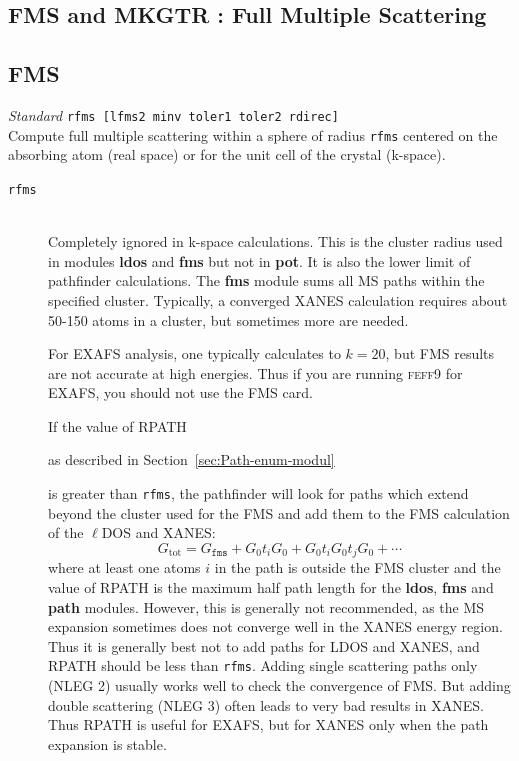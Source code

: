 \documentclass[11pt,oneside]{report} %
\renewcommand{\htmlref}[2]{\hyperlink{#2}{#1}}
\newcommand{\program}[1]{\textsc{#1}}
\newcommand{\feff}{\program{feff}}
\newcommand{\vnum}{9}
\newcommand{\feffcur}{\feff\vnum}
\newenvironment{Card}[4]%
      {\vspace{3ex}%
        \subsection{#1}
        \quad\textsl{#3}\newline
        \quad\texttt{#2}\newline%
        \label{card:#4}\\}
      {}
\newcommand{\module}[1]{\textrm{\bf{#1}}}
\renewcommand{\htmlref}[2]{{#1}} %
\begin{document}
  \subsection{FMS and MKGTR : Full Multiple Scattering}

\label{sec:Full-mult-scatt}


\begin{Card}{FMS}{rfms  [lfms2 minv toler1 toler2 rdirec]}{Standard}{fms}
  Compute full multiple scattering within a sphere of radius
  \texttt{rfms} centered on the absorbing atom (real space) or for the unit cell of the crystal (k-space).
\begin{description}
  \item[\texttt{rfms}]\hfill\\ Completely ignored in k-space calculations.  This is the cluster radius used in modules 
  \module{ldos} and \module{fms} but not in \module{pot}. It is also the lower 
  limit of pathfinder calculations. The \module{fms} module sums all MS paths within 
  the specified cluster. Typically, a converged XANES calculation requires
  about 50-150 atoms in a cluster, but sometimes more are needed.

  For EXAFS analysis, one typically calculates to $k=20$, but FMS results
  are not accurate at high energies. Thus if you are running
  {\feffcur} for EXAFS, you should not use the FMS card.

  If the value of \htmlref{RPATH}{card:rpa} 
  \begin{latexonly}
    as described in Section~\ref{sec:Path-enum-modul}
  \end{latexonly} 
  is greater than \texttt{rfms}, the
  pathfinder will look for paths which extend beyond the cluster used
  for the FMS and add them to the FMS calculation of the $\ell$DOS and
  XANES:
  $$G_{\mathrm{tot}}=G_{\mathtt{fms}} + G_0t_iG_0 +
  G_0t_iG_0t_jG_0+\cdots$$
  where at least one atoms $i$ in the path is outside the FMS cluster
  and the value of RPATH is the maximum half path length for the \module{ldos},
  \module{fms} and \module{path} modules. However, this is generally not recommended,
  as the MS expansion sometimes does not converge well in the XANES energy
  region. Thus it is generally best not to add paths for LDOS and XANES, and
  RPATH should be less than \texttt{rfms}. Adding single scattering
  paths only (NLEG 2) usually works well to check the convergence of
  FMS. But adding double scattering (NLEG 3) often leads to very bad
  results in XANES. Thus RPATH is useful for EXAFS, but for XANES only
  when the path expansion is stable.


\end{description}
\end{Card}
\end{document}
